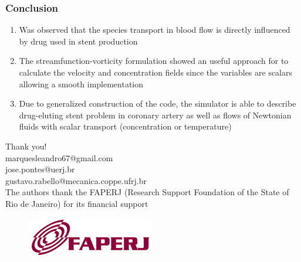 
\begin{frame}
 \frametitle{\LARGE Conclusion}
 \vspace{-1cm}
\begin{enumerate}
 \justifying
 \small
 \item Was observed that the species transport in blood flow is directly influenced
       by drug used in stent production\\

 \vspace{0.3cm}
 
 \item The streamfunction-vorticity formulation showed an useful approach for to calculate
       the velocity and concentration fields since the variables are scalars allowing a
       smooth implementation\\

 \vspace{0.3cm}

 \item Due to generalized construction of the code, the simulator is able to describe
       drug-eluting stent problem in coronary artery as well as flows of Newtonian fluids
       with scalar transport (concentration or temperature)
\end{enumerate}
\end{frame}



\begin{frame}
 \centering
 \vspace{-1cm}
 \Huge Thank you!\\
 \vspace{0.5cm}
 \small marquesleandro67@gmail.com\\
 \small jose.pontes@uerj.br\\
 \small gustavo.rabello@mecanica.coppe.ufrj.br\\
 \vspace{1.0cm}
 \small The authors thank the FAPERJ (Research Support Foundation of the State of Rio de Janeiro)
        for its financial support

 \vspace{-0.2cm}
 \begin{figure}
  \centering
  \includegraphics[scale=0.4]{images/faperj.jpg}\\
 \end{figure}
\end{frame}





